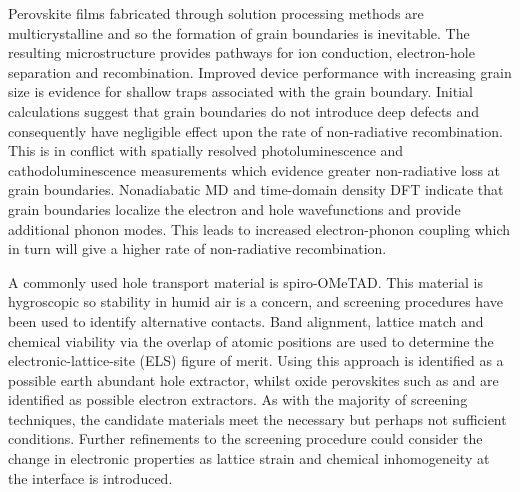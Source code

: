 Perovskite films fabricated through solution processing methods are multicrystalline and so the formation of grain boundaries is inevitable.
The resulting microstructure provides pathways for ion conduction, electron-hole separation and recombination.
Improved device performance with increasing grain size\autocite{Chen2016} is evidence for shallow traps associated with the grain boundary. %
%
Initial calculations suggest that grain boundaries do not introduce deep defects and consequently have negligible effect upon the rate of non-radiative recombination.\autocite{Yin2015b}
This is in conflict with spatially resolved photoluminescence\autocite{deQuilettes2015a} and cathodoluminescence\autocite{Bischak2015a} measurements which evidence greater non-radiative loss at grain boundaries.
Nonadiabatic MD and time-domain density DFT\autocite{Long2016a} indicate that grain boundaries localize the electron and hole wavefunctions and provide additional phonon modes.
This leads to increased electron-phonon coupling which in turn will give a higher rate of non-radiative recombination. 

A commonly used hole transport material is spiro-OMeTAD. This material is hygroscopic so stability in humid air is a concern,\autocite{Tai2016}
and screening procedures have been used to identify alternative contacts.\autocite{Butler2016a, Murray2015a} 
Band alignment, lattice match and chemical viability via the overlap of atomic positions are used to determine the electronic-lattice-site (ELS) figure of merit.\autocite{Butler2016a}
Using this approach  is identified as a possible earth abundant hole extractor, whilst oxide perovskites such as  and  are identified as possible electron extractors.
As with the majority of screening techniques, the candidate materials meet the necessary but perhaps not sufficient conditions. 
Further refinements to the screening procedure could consider the change in electronic properties as lattice strain and chemical inhomogeneity at the interface is introduced.

%




